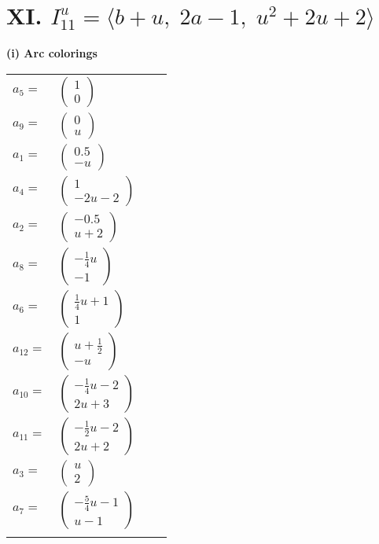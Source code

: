 \documentclass[1p]{elsarticle_modified}
\theoremstyle{definition}
\begin{document}
\centering \section*{XI. $I^u_{11}= \langle b+u,\;2 a-1,\;u^2+2 u+2 \rangle$}
\flushleft \textbf{(i) Arc colorings}\\
\begin{tabular}{m{7pt} m{180pt} m{7pt} m{180pt} }
\flushright $a_{5}=$&$\begin{pmatrix}1\\0\end{pmatrix}$ \\
\flushright $a_{9}=$&$\begin{pmatrix}0\\u\end{pmatrix}$ \\
\flushright $a_{1}=$&$\begin{pmatrix}0.5\\- u\end{pmatrix}$ \\
\flushright $a_{4}=$&$\begin{pmatrix}1\\-2 u-2\end{pmatrix}$ \\
\flushright $a_{2}=$&$\begin{pmatrix}-0.5\\u+2\end{pmatrix}$ \\
\flushright $a_{8}=$&$\begin{pmatrix}-\frac{1}{4} u\\-1\end{pmatrix}$ \\
\flushright $a_{6}=$&$\begin{pmatrix}\frac{1}{4} u+1\\1\end{pmatrix}$ \\
\flushright $a_{12}=$&$\begin{pmatrix}u+\frac{1}{2}\\- u\end{pmatrix}$ \\
\flushright $a_{10}=$&$\begin{pmatrix}-\frac{1}{4} u-2\\2 u+3\end{pmatrix}$ \\
\flushright $a_{11}=$&$\begin{pmatrix}-\frac{1}{2} u-2\\2 u+2\end{pmatrix}$ \\
\flushright $a_{3}=$&$\begin{pmatrix}u\\2\end{pmatrix}$ \\
\flushright $a_{7}=$&$\begin{pmatrix}-\frac{5}{4} u-1\\u-1\end{pmatrix}$\\&\end{tabular}
\end{document}
